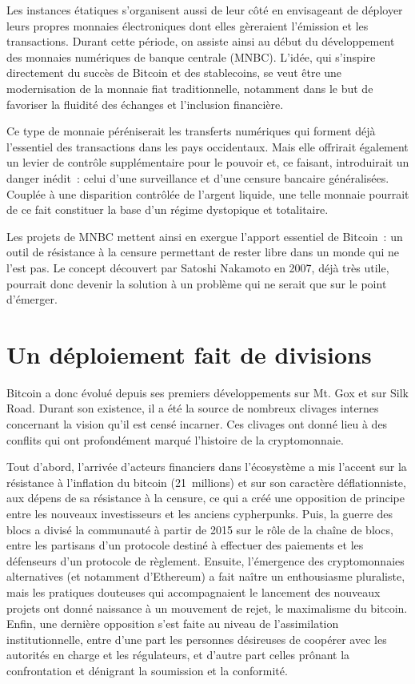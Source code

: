 Les instances étatiques s'organisent aussi de leur côté en envisageant de déployer leurs propres monnaies électroniques dont elles gèreraient l'émission et les transactions. Durant cette période, on assiste ainsi au début du développement des monnaies numériques de banque centrale (MNBC). L'idée, qui s'inspire directement du succès de Bitcoin et des stablecoins, se veut être une modernisation de la monnaie fiat traditionnelle, notamment dans le but de favoriser la fluidité des échanges et l'inclusion financière.

Ce type de monnaie péréniserait les transferts numériques qui forment déjà l'essentiel des transactions dans les pays occidentaux. Mais elle offrirait également un levier de contrôle supplémentaire pour le pouvoir et, ce faisant, introduirait un danger inédit~: celui d'une surveillance et d'une censure bancaire généralisées. Couplée à une disparition contrôlée de l'argent liquide, une telle monnaie pourrait de ce fait constituer la base d'un régime dystopique et totalitaire.

Les projets de MNBC mettent ainsi en exergue l'apport essentiel de Bitcoin~: un outil de résistance à la censure permettant de rester libre dans un monde qui ne l'est pas. Le concept découvert par Satoshi Nakamoto en 2007, déjà très utile, pourrait donc devenir la solution à un problème qui ne serait que sur le point d'émerger.

\section*{Un déploiement fait de divisions}

Bitcoin a donc évolué depuis ses premiers développements sur Mt. Gox et sur Silk Road. Durant son existence, il a été la source de nombreux clivages internes concernant la vision qu'il est censé incarner. Ces clivages ont donné lieu à des conflits qui ont profondément marqué l'histoire de la cryptomonnaie.

Tout d'abord, l'arrivée d'acteurs financiers dans l'écosystème a mis l'accent sur la résistance à l'inflation du bitcoin (21~millions) et sur son caractère déflationniste, aux dépens de sa résistance à la censure, ce qui a créé une opposition de principe entre les nouveaux investisseurs et les anciens cypherpunks. Puis, la guerre des blocs a divisé la communauté à partir de 2015 sur le rôle de la chaîne de blocs, entre les partisans d'un protocole destiné à effectuer des paiements et les défenseurs d'un protocole de règlement. Ensuite, l'émergence des cryptomonnaies alternatives (et notamment d'Ethereum) a fait naître un enthousiasme pluraliste, mais les pratiques douteuses qui accompagnaient le lancement des nouveaux projets ont donné naissance à un mouvement de rejet, le maximalisme du bitcoin. Enfin, une dernière opposition s'est faite au niveau de l'assimilation institutionnelle, entre d'une part les personnes désireuses de coopérer avec les autorités en charge et les régulateurs, et d'autre part celles prônant la confrontation et dénigrant la soumission et la conformité.


